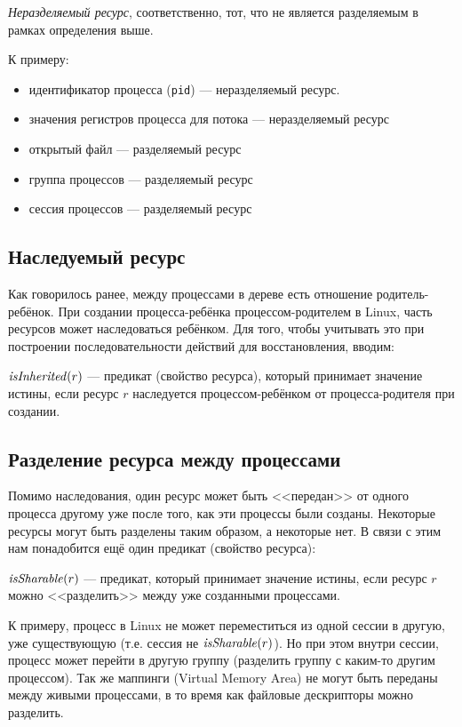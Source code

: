 \emph{Неразделяемый ресурс}, соответственно, тот, что не является разделяемым в рамках определения выше.

К примеру: 
\begin{itemize}
	\item идентификатор процесса (\texttt{pid}) --- неразделяемый ресурс.
	\item значения регистров процесса для потока --- неразделяемый ресурс
	\item открытый файл --- разделяемый ресурс
	\item группа процессов --- разделяемый ресурс
	\item сессия процессов --- разделяемый ресурс
\end{itemize}

\subsection{Наследуемый ресурс}
\label{subsec:inherres}

Как говорилось ранее, между процессами в дереве есть отношение родитель-ребёнок. При создании процесса-ребёнка процессом-родителем в Linux, часть ресурсов может наследоваться ребёнком. Для того, чтобы учитывать это при построении последовательности действий для восстановления, вводим:

\begin{defn}
\label{def:isinherited}
$\text{\textit{isInherited}}(r)$ --- предикат (свойство ресурса), который принимает значение истины, если ресурс $r$ наследуется процессом-ребёнком от процесса-родителя при создании.
\end{defn}

\subsection{Разделение ресурса между процессами}
\label{subsec:shareres}

Помимо наследования, один ресурс может быть <<передан>> от одного процесса другому уже после того, как эти процессы были созданы. Некоторые ресурсы могут быть разделены таким образом, а некоторые нет. В связи с этим нам понадобится ещё один предикат (свойство ресурса):

\begin{defn}
\label{def:issharable}
$\text{\textit{isSharable}}(r)$ --- предикат, который принимает значение истины, если ресурс $r$ можно <<разделить>> между уже созданными процессами.
\end{defn}

\begin{exmp}
К примеру, процесс в Linux не может переместиться из одной сессии в другую, уже существующую (т.е. сессия не $\text{\textit{isSharable}}(r)$). Но при этом внутри сессии, процесс может перейти в другую группу (разделить группу с каким-то другим процессом). Так же маппинги (Virtual Memory Area) не могут быть переданы между живыми процессами, в то время как файловые дескрипторы можно разделить.
\end{exmp}

